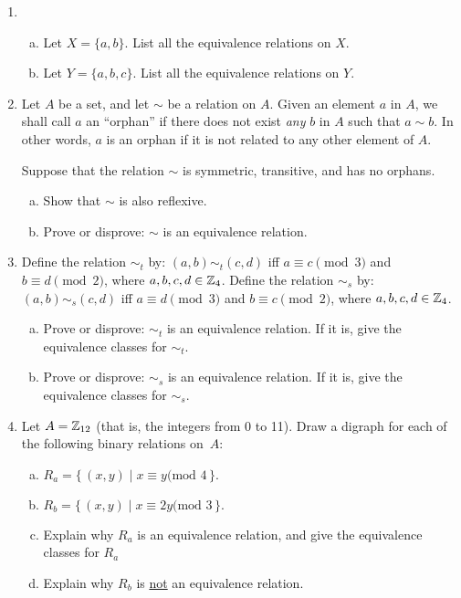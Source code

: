 \begin{enumerate}

\item
\begin{enumerate}[(a)]
\item
Let $X =\{a, b\}$. List all the equivalence relations on $X$.
\item
Let $Y =\{a, b,c\}$. List all the equivalence relations on $Y$.
\end{enumerate}

\item
Let $A$ be a set, and let $\sim$ be a relation on $A$. Given an element $a$ in  $A$, we shall call $a$ an ``orphan'' if there does not exist \emph{any} $b$ in $A$ such that $a \sim b$. In other words, $a$ is an orphan if it is not related to any other element of $A$.  

Suppose that the relation $\sim$ is symmetric, transitive, and has no orphans.  
\begin{enumerate}[(a)]
\item
Show that $\sim$ is also reflexive.
\item
Prove or disprove:  $\sim$ is an equivalence relation.
\end{enumerate}

\item
Define the relation $\sim_t$ by:  $(a,b) \sim_t  (c,d)$  iff $a \equiv c \pmod{3}$ and $b \equiv d \pmod{2}$, where $a,b,c,d  \in \mathbb{Z}_4$.  Define the relation $\sim_s$  by:  $(a,b) \sim_s (c,d)$ iff $a \equiv d \pmod{3}$ and 
$b \equiv c \pmod{2}$, where $a,b,c,d \in \mathbb{Z}_4$.
\begin{enumerate}[(a)]
\item
Prove or disprove: $\sim_t$ is an equivalence relation. If it is, give the equivalence classes for $\sim_t$.
\item
Prove or disprove: $\sim_s$ is an equivalence relation. If it is, give the equivalence classes for $\sim_s$.
\end{enumerate}

\item
Let $A =  \mathbb{Z}_{12}$  (that is, the integers from 0 to 11). Draw a digraph for each of the following binary relations on~$A$: 
 \begin{enumerate}[(a)]
 \item \label{DrawBinRelExer-married}
 $ R_a = \{\, (x,y) \mid  x \equiv y \text{(mod }4 \,\} .$
  \item \label{DrawBinRelExer-lived}
 $ R_b = \{\, (x,y) \mid  x \equiv 2y \text{(mod }3 \,\} .$
 \item
Explain why $R_a$ is an equivalence relation, and give the equivalence classes for $R_a$
\item
Explain why $R_b$ is \underline{not} an equivalence relation.
\end{enumerate}


\end{enumerate}
